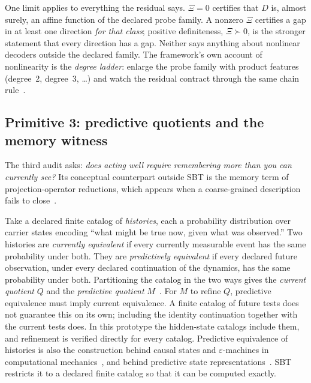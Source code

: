 One limit applies to everything the residual says. $\Xi = 0$ certifies that $D$ is, almost surely, an affine function of the declared probe family. A nonzero $\Xi$ certifies a gap in at least one direction \emph{for that class}; positive definiteness, $\Xi \succ 0$, is the stronger statement that every direction has a gap. Neither says anything about nonlinear decoders outside the declared family. The framework's own account of nonlinearity is the \emph{degree ladder}: enlarge the probe family with product features (degree~2, degree~3, \dots) and watch the residual contract through the same chain rule~\cite{sbt-xi,sbt-cast}.

\subsection{Primitive 3: predictive quotients and the memory witness}
\label{sec:sbt-quotients}

The third audit asks: \emph{does acting well require remembering more than you can currently see?} Its conceptual counterpart outside SBT is the memory term of projection-operator reductions, which appears when a coarse-grained description fails to close~\cite{chorin2000mori}.

Take a declared finite catalog of \emph{histories}, each a probability distribution over carrier states encoding ``what might be true now, given what was observed.'' Two histories are \emph{currently equivalent} if every currently measurable event has the same probability under both. They are \emph{predictively equivalent} if every declared future observation, under every declared continuation of the dynamics, has the same probability under both. Partitioning the catalog in the two ways gives the \emph{current quotient} $Q$ and the \emph{predictive quotient} $M$~\cite{sbt-hol}. For $M$ to refine $Q$, predictive equivalence must imply current equivalence. A finite catalog of future tests does not guarantee this on its own; including the identity continuation together with the current tests does. In this prototype the hidden-state catalogs include them, and refinement is verified directly for every catalog. Predictive equivalence of histories is also the construction behind causal states and $\varepsilon$-machines in computational mechanics~\cite{crutchfield1989statistical,shalizi2001computational}, and behind predictive state representations~\cite{littman2001predictive}. SBT restricts it to a declared finite catalog so that it can be computed exactly.

